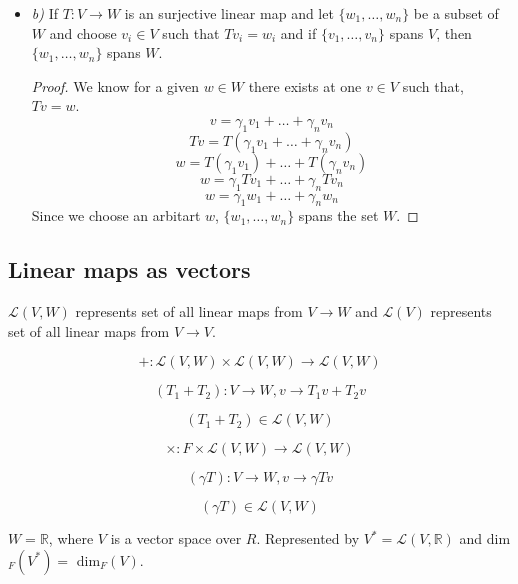 \documentclass[11pt,a4paper]{colorart}
\def\l{\left}
\def\r{\right}
\def\R{\mathbb{R}}
\def\g{\gamma}
\def\L{\mathcal{L}}
\begin{document}
\begin{enumerate}
\begin{itemize}
\begin{proof}
					Injectivity of the linear map implies,
					\[ \g_1v_2 + \dots + \g_nv_n = 0\]
					Linear independence of $\{v_1,\dots,v_n\}$
					\[ \g_1 = \dots = \g_n = 0 \]
				\end{proof}
			\item \textit{b)} If $T:V\rightarrow W$ is an surjective linear map and let $\{w_1,\dots,w_n\}$ be a subset of $W$ and choose $v_i\in V$ such that $Tv_i = w_i$ and if $\{v_1,\dots,v_n\}$ spans $V$, then $\{w_1,\dots,w_n\}$ spans $W$.
				\begin{proof}
					We know for a given $w\in W$ there exists at one $v\in V$ such that, $Tv=w$.
					\[ v = \g_1v_1+\dots+\g_nv_n\]
					\[ Tv = T\l(\g_1v_1+\dots+\g_nv_n\r)\]
					\[ w = T\l(\g_1v_1\r)+\dots+T\l(\g_nv_n\r)\]
					\[ w = \g_1 Tv_1 + \dots + \g_n Tv_n \]
					\[ w = \g_1 w_1 +\dots+ \g_n w_n \]
					Since we choose an arbitart $w$, $\{w_1,\dots,w_n\}$ spans the set $W$.
				\end{proof}
		\end{itemize}
\end{enumerate}

\subsection{Linear maps as vectors}

\begin{convention}
	$\L\l(V,W\r)$ represents set of all linear maps from $V\rightarrow W$ and $\L\l(V\r)$ represents set of all linear maps from $V\rightarrow V$.
\end{convention}

\[ +:\L\l(V,W\r) \times \L\l(V,W\r) \rightarrow \L\l(V,W\r) \]

\[ \l(T_1+T_2\r): V \rightarrow W, v \rightarrow T_1v+T_2v \]

\[ \l(T_1+T_2\r) \in \L\l(V,W\r) \]

\[ \times :F \times \L\l(V,W\r) \rightarrow \L\l(V,W\r) \]

\[ \l(\g T\r): V \rightarrow W, v \rightarrow \g Tv \]

\[ \l(\g T\r) \in \L\l(V,W\r) \]

\begin{example}[Dual of $V$]
	$W = \R$, where $V$ is a vector space over $R$. Represented by $V^*=\L\l(V,\R\r)$ and dim$_F\l(V^*\r)=$ dim$_F\l(V\r)$.
\end{example}
\end{document}
